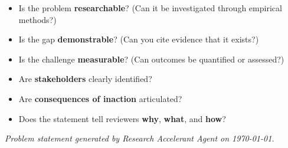 \documentclass[11pt,a4paper]{article}
\begin{document}
\begin{itemize}[leftmargin=*, label=$\square$]
    \item Is the problem \textbf{researchable}? (Can it be investigated through empirical methods?)
    \item Is the gap \textbf{demonstrable}? (Can you cite evidence that it exists?)
    \item Is the challenge \textbf{measurable}? (Can outcomes be quantified or assessed?)
    \item Are \textbf{stakeholders} clearly identified?
    \item Are \textbf{consequences of inaction} articulated?
    \item Does the statement tell reviewers \textbf{why}, \textbf{what}, and \textbf{how}?
\end{itemize}

\vfill
\begin{center}
\textit{Problem statement generated by Research Accelerant Agent on \today.}
\end{center}
\end{document}
